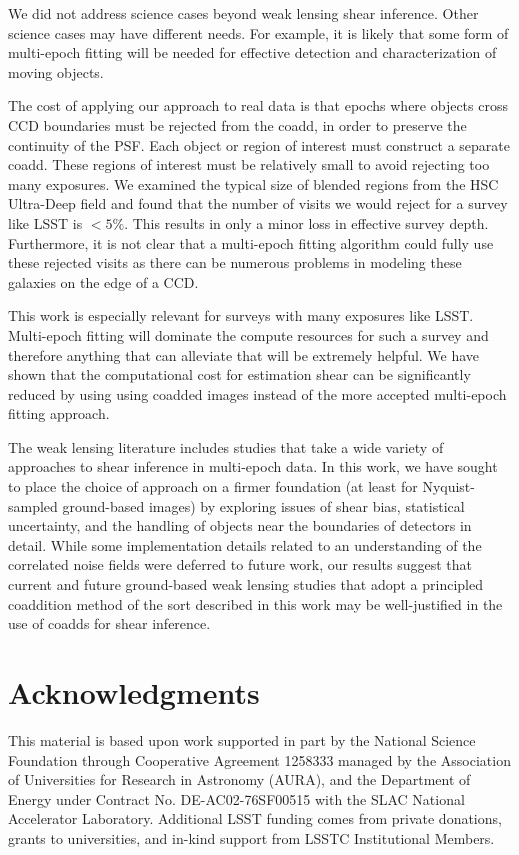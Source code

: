 \documentclass[fleqn,useAMS,usenatbib]{mnras}
\begin{document}
We did not address science cases beyond weak lensing shear inference.  Other science cases may have
different needs.  For example, it is likely that some form of multi-epoch fitting will be needed for
effective detection and characterization of moving objects.

The cost of applying our approach to real data is that epochs where objects
cross CCD boundaries must be rejected from the coadd, in order to preserve the
continuity of the PSF.  Each object or region of interest must construct a
separate coadd.  These regions of interest must be relatively small to avoid
rejecting too many exposures.  We examined the typical size of blended regions
from the HSC Ultra-Deep field and found that the number of visits we would
reject for a survey like LSST is $< 5\%$.  This results in only a minor loss in
effective survey depth.  Furthermore, it is not clear that a multi-epoch fitting
algorithm could fully use these rejected visits as there can be numerous
problems in modeling these galaxies on the edge of a CCD.

This work is especially relevant for surveys with many exposures like LSST.  Multi-epoch fitting 
will dominate the compute resources for such a survey and therefore anything that can alleviate that will
be extremely helpful.  We have shown that the computational cost
for estimation shear can be significantly reduced by using using coadded images instead of the more
accepted multi-epoch fitting approach.

The weak lensing literature includes studies that take a wide variety of approaches to shear
inference in multi-epoch data.  In this work, we have sought to place the choice of approach on a firmer
foundation (at least for Nyquist-sampled ground-based images) by exploring issues of shear bias,
statistical uncertainty, and the handling of objects near the boundaries of detectors in detail.
While some implementation details related to an understanding of the correlated noise fields were
deferred to future work, our results suggest that current and future ground-based weak lensing
studies that adopt a principled coaddition method of the sort described in this work may be
well-justified in the use of coadds for shear inference.

\section*{Acknowledgments}


This  material  is  based  upon  work  supported  in  part  by  the  National  Science  Foundation  through  Cooperative Agreement 1258333 managed by the Association of Universities for Research in Astronomy (AURA), and the Department of Energy under Contract  No.  DE-AC02-76SF00515 with the SLAC National Accelerator  Laboratory.      Additional  LSST funding  comes  from  private  donations,  grants  to  universities,  and in-kind support from LSSTC Institutional Members.
\end{document}
